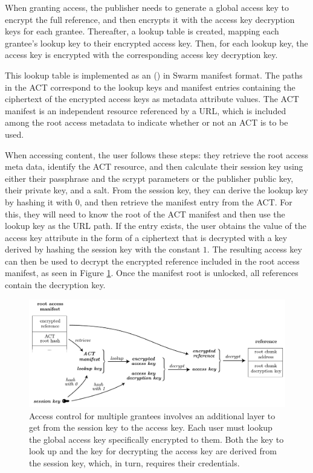 When granting access, the publisher needs to generate a global access key to encrypt the full reference, and then encrypts it with the
access key decryption keys for each grantee. Thereafter, a lookup table is created, mapping each grantee's lookup key to their encrypted access key. Then, for each lookup key, the access key is encrypted with the corresponding access key decryption key.

This lookup table is implemented as an  () in Swarm manifest format. The paths in the ACT correspond to the lookup keys and manifest entries containing the ciphertext of the encrypted access keys as metadata attribute values. The ACT manifest is an independent resource referenced by a URL, which is included among the root access metadata to indicate whether or not an ACT is to be used.

When accessing content, the user follows these steps: they retrieve the root access meta data, identify the ACT resource, and then calculate their session key using either their passphrase and the scrypt parameters or the publisher public key, their private key, and a salt. From the session key, they can derive the lookup key by hashing it with $0$, and then retrieve the manifest entry from the ACT. For this, they will need to know the root of the ACT manifest and then use the lookup key as the URL path. If the entry exists, the user obtains the value of the access key attribute in the form of a ciphertext that is decrypted with a key derived by hashing the session key with the constant $1$. The resulting access key can then be used to decrypt the encrypted reference included in the root access manifest, as seen in Figure \ref{fig:access-control-multiple-party}. Once the manifest root is unlocked, all references contain the decryption key.

\begin{figure}[htbp]
\centering
\includegraphics[width=\textwidth]{fig/access-control-multiple-party.pdf}
\caption[Access control for multiple grantees \statusyellow]{Access control for multiple grantees involves an additional layer to get from the session key to the access key. Each user must lookup the global access key specifically encrypted to them. Both the key to look up and the key for decrypting the access key are derived from the session key, which, in turn, requires their credentials.} 
\label{fig:access-control-multiple-party}
\end{figure}

